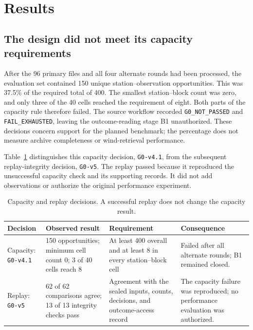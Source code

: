 \section{Results}
\label{sec:results}

\subsection{The design did not meet its capacity requirements}
After the 96 primary files and all four alternate rounds had been processed, the evaluation set contained 150 unique station--observation opportunities. This was 37.5\% of the required total of 400. The smallest station--block count was zero, and only three of the 40 cells reached the requirement of eight. Both parts of the capacity rule therefore failed. The source workflow recorded \texttt{G0\_NOT\_PASSED} and \texttt{FAIL\_EXHAUSTED}, leaving the outcome-reading stage B1 unauthorized. These decisions concern support for the planned benchmark; the percentage does not measure archive completeness or wind-retrieval performance.

Table~\ref{tab:gate-results} distinguishes this capacity decision, \texttt{G0-v4.1}, from the subsequent replay-integrity decision, \texttt{G0-v5}. The replay passed because it reproduced the unsuccessful capacity check and its supporting records. It did not add observations or authorize the original performance experiment.

\begin{table}[t]
\caption{Capacity and replay decisions. A successful replay does not change the capacity result.}
\label{tab:gate-results}
\centering
\small
\begin{tabularx}{\textwidth}{@{}>{\raggedright\arraybackslash}p{}p{}p{}X@{}}
\toprule
Decision & Observed result & Requirement & Consequence \\
\midrule
Capacity: \texttt{G0-v4.1} &
150 opportunities; minimum cell count 0; 3 of 40 cells reach 8 &
At least 400 overall and at least 8 in every station--block cell &
Failed after all alternate rounds; B1 remained closed. \\
Replay: \texttt{G0-v5} &
62 of 62 comparisons agree; 13 of 13 integrity checks pass &
Agreement with the sealed inputs, counts, decisions, and outcome-access record &
The capacity failure was reproduced; no performance evaluation was authorized. \\
\bottomrule
\end{tabularx}
\end{table}

